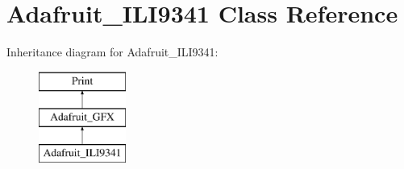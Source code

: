 \hypertarget{class_adafruit___i_l_i9341}{}\section{Adafruit\+\_\+\+I\+L\+I9341 Class Reference}
\label{class_adafruit___i_l_i9341}
Inheritance diagram for Adafruit\+\_\+\+I\+L\+I9341\+:\begin{figure}[H]
\begin{center}
\leavevmode
\includegraphics[height=3.000000cm]{class_adafruit___i_l_i9341}
\end{center}
\end{figure}
